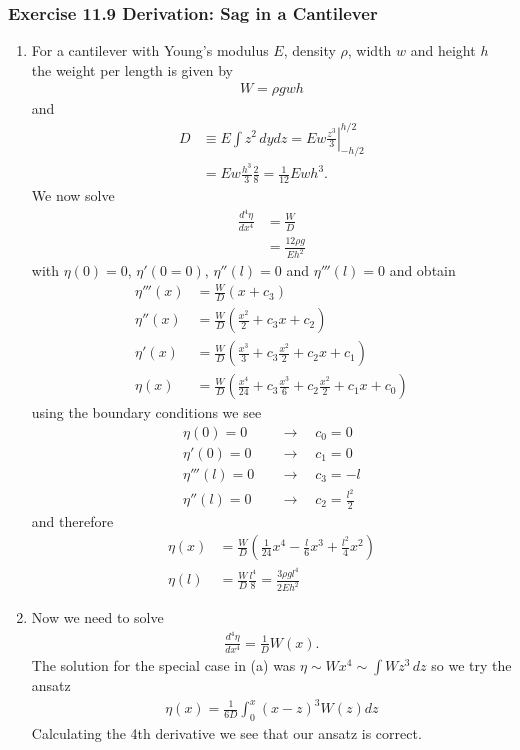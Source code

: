 \documentclass[10pt,a4paper]{article}
\theoremstyle{definition}
\begin{document}
\subsubsection{Exercise 11.9 Derivation: Sag in a Cantilever}
\begin{enumerate}[label=(\alph*)]
\item For a cantilever with Young's modulus $E$, density $\rho$, width $w$ and height $h$ the weight per length is given by
\begin{align}
    W=\rho g w h
\end{align}
and
\begin{align}
    D&\equiv E\int z^2\,dydz=Ew \left.\frac{z^3}{3}\right|_{-h/2}^{h/2}\\
    &=Ew\frac{h^3}{3}\frac{2}{8}=\frac{1}{12}Ewh^3.
\end{align}
We now solve
\begin{align}
    \frac{d^4\eta}{dx^4}
    &=\frac{W}{D}\\
    &=\frac{12\rho g}{Eh^2}
\end{align}
with $\eta(0)=0$, $\eta'(0=0)$, $\eta''(l)=0$ and $\eta'''(l)=0$ and obtain
\begin{align}
    \eta'''(x)&=\frac{W}{D}\left(x+c_3\right)\\
    \eta''(x)&=\frac{W}{D}\left(\frac{x^2}{2}+c_3x+c_2\right)\\
    \eta'(x)&=\frac{W}{D}\left(\frac{x^3}{3}+c_3\frac{x^2}{2}+c_2x +c_1\right)\\
    \eta(x)&=\frac{W}{D}\left(\frac{x^4}{24}+c_3\frac{x^3}{6}+c_2\frac{x^2}{2} +c_1x+c_0\right)
\end{align}
using the boundary conditions we see
\begin{align}
    \eta(0)=0    \quad&\rightarrow\quad c_0=0\\
    \eta'(0)=0   \quad&\rightarrow\quad c_1=0\\
    \eta'''(l)=0 \quad&\rightarrow\quad c_3=-l\\
    \eta''(l)=0  \quad&\rightarrow\quad c_2=\frac{l^2}{2}
\end{align}
and therefore
\begin{align}
    \eta(x)&=\frac{W}{D}\left(\frac{1}{24}x^4-\frac{l}{6}x^3+\frac{l^2}{4}x^2\right)\\
    \eta(l)&=\frac{W}{D}\frac{l^4}{8}=\frac{3\rho gl^4}{2Eh^2}
\end{align}

\item Now we need to solve
\begin{align}
    \frac{d^4\eta}{dx^4}=\frac{1}{D}W(x).
\end{align}
The solution for the special case in (a) was $\eta\sim W x^4\sim\int W z^3\,dz$ so we try the ansatz
\begin{align}
    \eta(x)=\frac{1}{6D}\int_0^x(x-z)^3W(z)dz
\end{align}
Calculating the 4th derivative we see that our ansatz is correct.


\end{enumerate}
\end{document}
